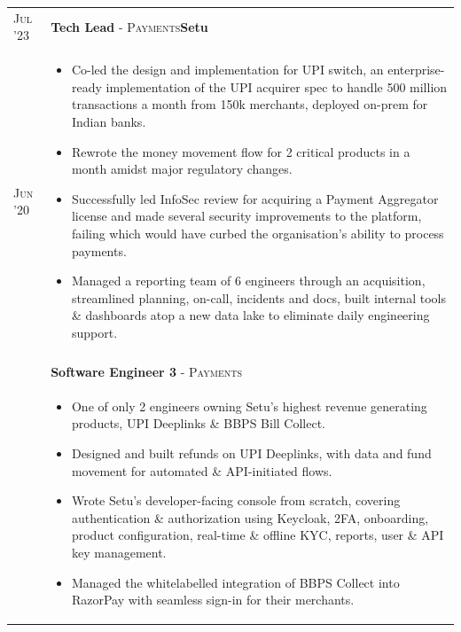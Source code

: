 \documentclass[a4paper,10pt]{extarticle} %
\begin{document}
\begin{tabularx}{\linewidth}{l | X}
\textsc{Jul '23} & \textbf{Tech Lead} \textsc{- Payments}\hfill\raisebox{-.2\height}{ \hspace{0.3em}}\textbf{Setu}\\
\textsc{Jun '20} & \begin{itemize}[leftmargin=*, nosep, before=\vspace{-0.8\baselineskip}, after=\vspace{-1.0\baselineskip}]
  \item Co-led the design and implementation for UPI switch, an enterprise-ready implementation of the UPI acquirer spec to handle 500 million transactions a month from 150k merchants, deployed on-prem for Indian banks.
  \item Rewrote the money movement flow for 2 critical products in a month amidst major regulatory changes.
  \item Successfully led InfoSec review for acquiring a Payment Aggregator license and made several security improvements to the platform, failing which would have curbed the organisation's ability to process payments.
  \item Managed a reporting team of 6 engineers through an acquisition, streamlined planning, on-call, incidents and docs, built internal tools \& dashboards atop a new data lake to eliminate daily engineering support.
\end{itemize}\\\\
& \textbf{Software Engineer 3} \textsc{- Payments}\\
& \begin{itemize}[leftmargin=*, nosep, before=\vspace{-0.8\baselineskip}, after=\vspace{-1.0\baselineskip}]
  \item One of only 2 engineers owning Setu's highest revenue generating products, UPI Deeplinks \& BBPS Bill Collect.
  \item Designed and built refunds on UPI Deeplinks, with data and fund movement for automated \& API-initiated flows.
  \item Wrote Setu's developer-facing console from scratch, covering authentication \& authorization using Keycloak, 2FA, onboarding, product configuration, real-time \& offline KYC, reports, user \& API key management.
  \item Managed the whitelabelled integration of BBPS Collect into RazorPay with seamless sign-in for their merchants.

\end{itemize}
\end{tabularx}
\end{document}
